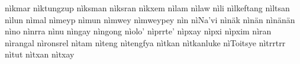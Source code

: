 nìkmar\hspace{2mm}
nìktungzup\hspace{2mm}
nìksman\hspace{2mm}
nìksran\hspace{2mm}
nìkxem\hspace{2mm}
nìlam\hspace{2mm}
nìlaw\hspace{2mm}
nìli\hspace{2mm}
nìlkeftang\hspace{2mm}
nìltsan\hspace{2mm}
nìlun\hspace{2mm}
nìmal\hspace{2mm}
nìmeyp\hspace{2mm}
nìmun\hspace{2mm}
nìmwey\hspace{2mm}
nìmweypey\hspace{2mm}
nìn\hspace{2mm}
nìNa'vi\hspace{2mm}
nìnäk\hspace{2mm}
nìnän\hspace{2mm}
nìnänän\hspace{2mm}
nìno\hspace{2mm}
nìnrra\hspace{2mm}
nìnu\hspace{2mm}
nìngay\hspace{2mm}
nìngong\hspace{2mm}
nìolo'\hspace{2mm}
nìprrte'\hspace{2mm}
nìpxay\hspace{2mm}
nìpxi\hspace{2mm}
nìpxim\hspace{2mm}
nìran\hspace{2mm}
nìrangal\hspace{2mm}
nìronsrel\hspace{2mm}
nìtam\hspace{2mm}
nìteng\hspace{2mm}
nìtengfya\hspace{2mm}
nìtkan\hspace{2mm}
nìtkanluke\hspace{2mm}
nìToitsye\hspace{2mm}
nìtrrtrr\hspace{2mm}
nìtut\hspace{2mm}
nìtxan\hspace{2mm}
nìtxay\hspace{2mm}
